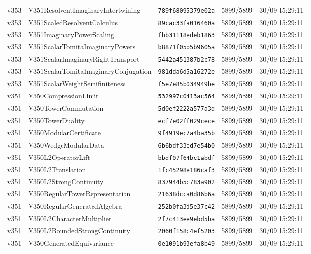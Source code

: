 \documentclass[11pt]{article}
\theoremstyle{definition}\newtheorem{deriv}{Derivação}
\begin{document}
{\begin{longtable}{@{}lllll@{}}
v353 & V351ResolventImaginaryIntertwining & \texttt{789f68095379e02a} & 5899/5899 & 30/09 15:29:11 \\
v353 & V351ScaledResolventCalculus & \texttt{89cac33fa016460a} & 5899/5899 & 30/09 15:29:11 \\
v353 & V351ImaginaryPowerScaling & \texttt{fbb31118edeb1863} & 5899/5899 & 30/09 15:29:11 \\
v353 & V351ScalarTomitaImaginaryPowers & \texttt{b8871f05b5b9605a} & 5899/5899 & 30/09 15:29:11 \\
v353 & V351ScalarImaginaryRightTransport & \texttt{5442a451387b2c78} & 5899/5899 & 30/09 15:29:11 \\
v353 & V351ScalarTomitaImaginaryConjugation & \texttt{981dda6d5a16272e} & 5899/5899 & 30/09 15:29:11 \\
v353 & V351ScalarWeightSemifiniteness & \texttt{f5e7e85b034949be} & 5899/5899 & 30/09 15:29:11 \\
v351 & V350CompressionLimit & \texttt{532997c0413ac564} & 5899/5899 & 30/09 15:29:11 \\
v351 & V350TowerCommutation & \texttt{5d0ef2222a577a3d} & 5899/5899 & 30/09 15:29:11 \\
v351 & V350TowerDuality & \texttt{ecf7e02ff029cece} & 5899/5899 & 30/09 15:29:11 \\
v351 & V350ModularCertificate & \texttt{9f4919ec7a4ba35b} & 5899/5899 & 30/09 15:29:11 \\
v351 & V350WedgeModularData & \texttt{6b6bdf33ed7e54b0} & 5899/5899 & 30/09 15:29:11 \\
v351 & V350L2OperatorLift & \texttt{bbdf07f64bc1abdf} & 5899/5899 & 30/09 15:29:11 \\
v351 & V350L2Translation & \texttt{1fc45298e186caf3} & 5899/5899 & 30/09 15:29:11 \\
v351 & V350L2StrongContinuity & \texttt{837944b5c783a902} & 5899/5899 & 30/09 15:29:11 \\
v351 & V350RegularTowerRepresentation & \texttt{21638dcca0d86b6a} & 5899/5899 & 30/09 15:29:11 \\
v351 & V350RegularGeneratedAlgebra & \texttt{252b0fa3d5e37c42} & 5899/5899 & 30/09 15:29:11 \\
v351 & V350L2CharacterMultiplier & \texttt{2f7c413ee9ebd5ba} & 5899/5899 & 30/09 15:29:11 \\
v351 & V350L2BoundedStrongContinuity & \texttt{2060f158c4ef5203} & 5899/5899 & 30/09 15:29:11 \\
v351 & V350GeneratedEquivariance & \texttt{0e1091b93efa8b49} & 5899/5899 & 30/09 15:29:11 \\

\end{longtable}}
\end{document}
